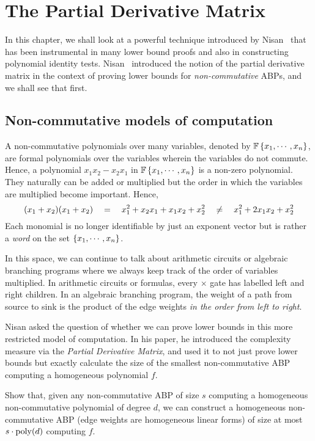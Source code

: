 \chapter{The Partial Derivative Matrix}\label{chap:evalDim}

In this chapter, we shall look at a powerful technique introduced by Nisan~\cite{nis91} that has been instrumental in many lower bound proofs and also in constructing polynomial identity tests.
Nisan~\cite{nis91} introduced the notion of the partial derivative matrix in the context of proving lower bounds for \emph{non-commutative} ABPs, and we shall see that first.

\section{Non-commutative models of computation}

A non-commutative polynomials over many variables, denoted by $\mathbb{F}\left\{x_1,\cdots, x_n\right\}$, are formal polynomials over the variables wherein the variables do not commute.
Hence, a polynomial $x_1x_2 - x_2x_1$ in $\mathbb{F}\left\{x_1,\cdots, x_n\right\}$ is a non-zero polynomial.
They naturally can be added or multiplied but the order in which the variables are multiplied become important.
Hence,
\[
(x_1 + x_2)(x_1 + x_2) \quad = \quad x_1^2 + x_2x_1 + x_1x_2 + x_2^2 \quad \neq \quad x_1^2 + 2x_1x_2 + x_2^2
\]
Each monomial is no longer identifiable by just an exponent vector but is rather a \emph{word} on the set $\left\{x_1,\cdots, x_n\right\}$. 

In this space, we can continue to talk about arithmetic circuits or algebraic branching programs where we always keep track of the order of variables multiplied.
In arithmetic circuits or formulas, every $\times$ gate has labelled left and right children.
In an algebraic branching program, the weight of a path from source to sink is the product of the edge weights \emph{in the order from left to right}.

Nisan \cite{nis91} asked the question of whether we can prove lower bounds in this more restricted model of computation. In his paper, he introduced the complexity measure via the \emph{Partial Derivative Matrix}, and used it to not just prove lower bounds but exactly calculate the size of the smallest non-commutative ABP computing a homogeneous polynomial $f$. \\

\begin{exercise}
Show that, given any non-commutative ABP of size $s$ computing a homogeneous non-commutative polynomial of degree $d$, we can construct a homogeneous non-commutative ABP (edge weights are homogeneous linear forms) of size at most $s \cdot \operatorname{poly}(d)$ computing $f$. 
\end{exercise}

